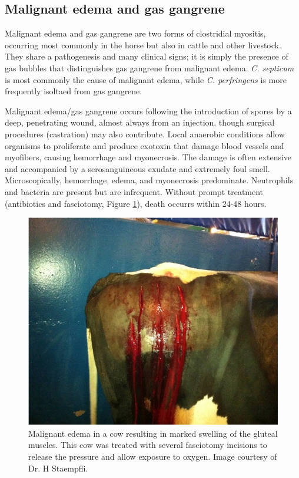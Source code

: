 \documentclass[openany]{book}
\begin{document}
\subsection{Malignant edema and gas
gangrene}\label{malignant-edema-and-gas-gangrene}

Malignant edema and gas gangrene are two forms of clostridial myositis,
occurring most commonly in the horse but also in cattle and other
livestock. They share a pathogenesis and many clinical signs; it is
simply the presence of gas bubbles that distinguishes gas gangrene from
malignant edema. \emph{C. septicum} is most commonly the cause of
malignant edema, while \emph{C. perfringens} is more frequently isoltaed
from gas gangrene.

Malignant edema/gas gangrene occurs following the introduction of spores
by a deep, penetrating wound, almost always from an injection, though
surgical procedures (castration) may also contribute. Local anaerobic
conditions allow organisms to proliferate and produce exotoxin that
damage blood vessels and myofibers, causing hemorrhage and myonecrosis.
The damage is often extensive and accompanied by a serosanguineous
exudate and extremely foul smell. Microscopically, hemorrhage, edema,
and myonecrosis predominate. Neutrophils and bacteria are present but
are infrequent. Without prompt treatment (antibiotics and fasciotomy,
Figure \ref{fig:fasciotomy}), death occurrs within 24-48 hours.

\begin{figure}

{\centering \includegraphics[width=0.6\linewidth]{images/fasciotomy} 

}

\caption{Malignant edema in a cow resulting in marked swelling of the gluteal muscles. This cow was treated with several fasciotomy incisions to release the pressure and allow exposure to oxygen. Image courtesy of Dr. H Staempfli.}\label{fig:fasciotomy}
\end{figure}
\end{document}
